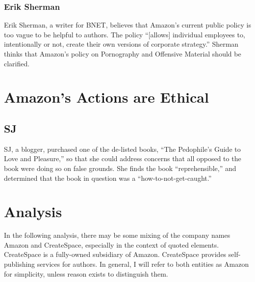 \documentclass[11pt]{article}
\begin{document}
\begin{multicols}{2}
\subsubsection{Erik Sherman}
Erik Sherman, a writer for BNET, believes that Amazon's current public policy is too vague to be helpful to authors.  The policy  ``[allows] individual employees to, intentionally or not, create their own versions of corporate strategy.'' \cite{ShermanAmazonExecs} Sherman thinks that Amazon's policy on Pornography and Offensive Material should be clarified.

\section{Amazon's Actions are Ethical}
\subsection{SJ}
SJ, a blogger, purchased one of the de-listed books, ``The Pedophile's Guide to Love and Pleasure,'' so that she could address concerns that all opposed to the book were doing so on false grounds.  She finds the book ``reprehensible,'' and determined that the book in question was a ``how-to-not-get-caught.'' \cite{iasshole}

\section{Analysis}
In the following analysis, there may be some mixing of the company names Amazon and CreateSpace, especially in the context of quoted elements.  CreateSpace is a fully-owned subsidiary of Amazon.  CreateSpace provides self-publishing services for authors.  In general, I will refer to both entities as Amazon for simplicity, unless reason exists to distinguish them.


\end{multicols}
\end{document}
